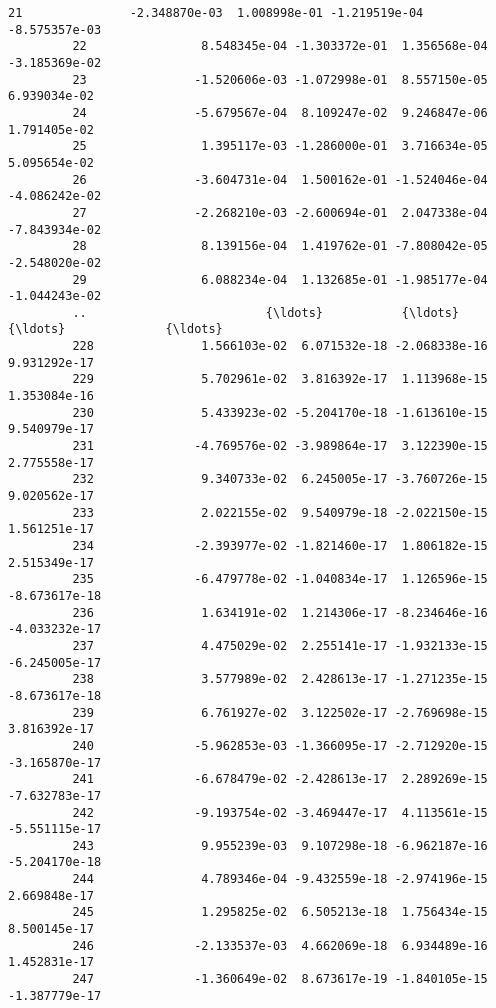 \documentclass[11pt]{article}
\begin{document}
\begin{Verbatim}[commandchars=\\\{\}]
         21               -2.348870e-03  1.008998e-01 -1.219519e-04    -8.575357e-03   
         22                8.548345e-04 -1.303372e-01  1.356568e-04    -3.185369e-02   
         23               -1.520606e-03 -1.072998e-01  8.557150e-05     6.939034e-02   
         24               -5.679567e-04  8.109247e-02  9.246847e-06     1.791405e-02   
         25                1.395117e-03 -1.286000e-01  3.716634e-05     5.095654e-02   
         26               -3.604731e-04  1.500162e-01 -1.524046e-04    -4.086242e-02   
         27               -2.268210e-03 -2.600694e-01  2.047338e-04    -7.843934e-02   
         28                8.139156e-04  1.419762e-01 -7.808042e-05    -2.548020e-02   
         29                6.088234e-04  1.132685e-01 -1.985177e-04    -1.044243e-02   
         ..                         {\ldots}           {\ldots}           {\ldots}              {\ldots}   
         228               1.566103e-02  6.071532e-18 -2.068338e-16     9.931292e-17   
         229               5.702961e-02  3.816392e-17  1.113968e-15     1.353084e-16   
         230               5.433923e-02 -5.204170e-18 -1.613610e-15     9.540979e-17   
         231              -4.769576e-02 -3.989864e-17  3.122390e-15     2.775558e-17   
         232               9.340733e-02  6.245005e-17 -3.760726e-15     9.020562e-17   
         233               2.022155e-02  9.540979e-18 -2.022150e-15     1.561251e-17   
         234              -2.393977e-02 -1.821460e-17  1.806182e-15     2.515349e-17   
         235              -6.479778e-02 -1.040834e-17  1.126596e-15    -8.673617e-18   
         236               1.634191e-02  1.214306e-17 -8.234646e-16    -4.033232e-17   
         237               4.475029e-02  2.255141e-17 -1.932133e-15    -6.245005e-17   
         238               3.577989e-02  2.428613e-17 -1.271235e-15    -8.673617e-18   
         239               6.761927e-02  3.122502e-17 -2.769698e-15     3.816392e-17   
         240              -5.962853e-03 -1.366095e-17 -2.712920e-15    -3.165870e-17   
         241              -6.678479e-02 -2.428613e-17  2.289269e-15    -7.632783e-17   
         242              -9.193754e-02 -3.469447e-17  4.113561e-15    -5.551115e-17   
         243               9.955239e-03  9.107298e-18 -6.962187e-16    -5.204170e-18   
         244               4.789346e-04 -9.432559e-18 -2.974196e-15     2.669848e-17   
         245               1.295825e-02  6.505213e-18  1.756434e-15     8.500145e-17   
         246              -2.133537e-03  4.662069e-18  6.934489e-16     1.452831e-17   
         247              -1.360649e-02  8.673617e-19 -1.840105e-15    -1.387779e-17   

\end{Verbatim}
\end{document}
